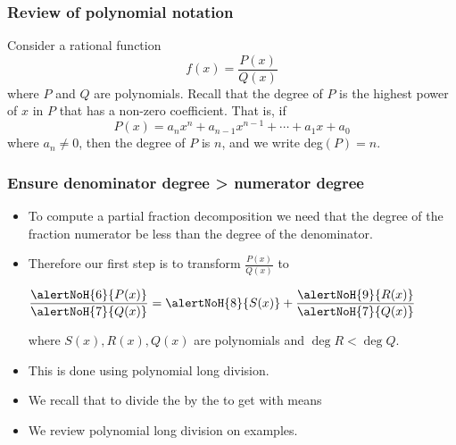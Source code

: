 \begin{frame}
\frametitle{Review of polynomial notation}
Consider a rational function
\[
f(x) = \frac{P(x)}{Q(x)}
\]
where $P$ and $Q$ are polynomials.  Recall that the degree of $P$ is the highest power of $x$ in $P$ that has a non-zero coefficient.  That is, if
\[
P(x) = a_nx^n + a_{n-1}x^{n-1} + \cdots + a_1x + a_0
\]
where $a_n \neq 0$, then the degree of $P$ is $n$, and we write deg$(P) = n$.

\end{frame}
\begin{frame}\frametitle{Ensure denominator degree > numerator degree}
\begin{itemize}
\item To compute a partial fraction decomposition we need that the degree of the fraction numerator be less than the degree of the denominator.
\item<2-> Therefore our first step is to transform $\frac{P(x)}{Q(x)}$ to

$\displaystyle \frac{\alertNoH{6}{P(x)}}{\alertNoH{7}{Q(x)} }= \alertNoH{8}{S(x)}+\frac{\alertNoH{9}{R(x)}}{\alertNoH{7}{Q(x)}} $

where $S(x), R(x), Q(x)$ are polynomials and $\deg R<\deg Q$.
\item<3-> This is done using polynomial long division.
\item<4-> We recall that to divide the  by the  to get  with  means 
\item<10-> We review polynomial long division on examples.
\end{itemize}



\end{frame}
